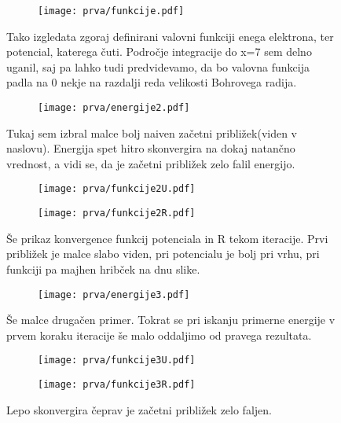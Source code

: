\documentclass{article}
\begin{document}
\begin{figure}[H]
\centering
\begin{subfigure}{.6\textwidth}
\texttt{[image: prva/funkcije.pdf]}
\end{subfigure}
\caption*{Tako izgledata zgoraj definirani valovni funkciji enega elektrona, ter potencial, katerega čuti. Področje integracije do x=7 sem delno uganil, saj pa lahko tudi predvidevamo, da bo valovna funkcija padla na 0 nekje na razdalji reda velikosti Bohrovega radija.}
\end{figure}

\begin{figure}[H]
\centering
\begin{subfigure}{.6\textwidth}
\texttt{[image: prva/energije2.pdf]}
\end{subfigure}
\caption*{Tukaj sem izbral malce bolj naiven začetni približek(viden v naslovu). Energija spet hitro skonvergira na dokaj natančno vrednost, a vidi se, da je začetni približek zelo falil energijo.}
\end{figure}

\begin{figure}[H]
\centering
\begin{subfigure}{.45\textwidth}
\texttt{[image: prva/funkcije2U.pdf]}
\end{subfigure}
\begin{subfigure}{.45\textwidth}
\texttt{[image: prva/funkcije2R.pdf]}
\end{subfigure}
\caption*{Še prikaz konvergence funkcij potenciala in R tekom iteracije. Prvi približek je malce slabo viden, pri potencialu je bolj pri vrhu, pri funkciji pa majhen hribček na dnu slike.}
\end{figure}

\begin{figure}[H]
\centering
\begin{subfigure}{.6\textwidth}
\texttt{[image: prva/energije3.pdf]}
\end{subfigure}
\caption*{Še malce drugačen primer. Tokrat se pri iskanju primerne energije v prvem koraku iteracije še malo oddaljimo od pravega rezultata.}
\end{figure}

\begin{figure}[H]
\centering
\begin{subfigure}{.45\textwidth}
\texttt{[image: prva/funkcije3U.pdf]}
\end{subfigure}
\begin{subfigure}{.45\textwidth}
\texttt{[image: prva/funkcije3R.pdf]}
\end{subfigure}
\caption*{Lepo skonvergira čeprav je začetni približek zelo faljen.}
\end{figure}
\end{document}
